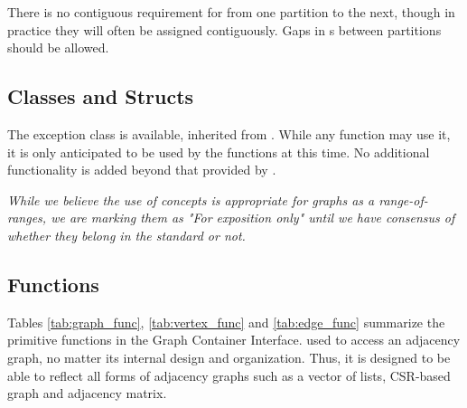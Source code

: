 There is no contiguous requirement for  from one partition to the next, though
in practice they will often be assigned contiguously. Gaps in s between partitions should be allowed.

\subsection{Classes and Structs}

The  exception class is available, inherited from . While any function may use it, it 
is only anticipated to be used by the  functions at this time.
No additional functionality is added beyond that provided by .

\emph{While we believe the use of concepts is appropriate for graphs as a range-of-ranges, we are marking them as "For exposition only" 
until we have consensus of whether they belong in the standard or not.}

\subsection{Functions}

Tables \ref{tab:graph_func}, \ref{tab:vertex_func} and \ref{tab:edge_func} summarize the primitive functions in the Graph Container Interface.
used to access an adjacency graph, no matter its internal design and organization. Thus, it is designed 
to be able to reflect all forms of adjacency graphs such as a vector of lists, CSR-based graph and adjacency matrix.

